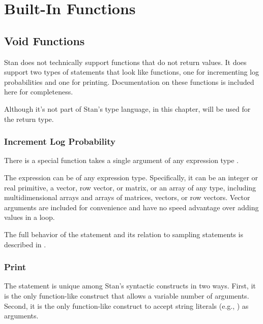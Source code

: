 \part{Built-In Functions}\label{built-in-functions.part}




\chapter{Void Functions}

Stan does not technically support functions that do not return values.
It does support two types of statements that look like functions, one
for incrementing log probabilities and one for printing.
Documentation on these functions is included here for completeness.

Although it's not part of Stan's type language, in this chapter,
 will be used for the return type.

\section{Increment Log Probability}

There is a special function  takes a single
argument of any expression type .
%
\begin{description}
\end{description}
%
The expression  can be of any expression type.  Specifically,
it can be an integer or real primitive, a vector, row vector, or
matrix, or an array of any type, including multidimensional arrays and
arrays of matrices, vectors, or row vectors.  Vector arguments are
included for convenience and have no speed advantage over adding
values in a loop.

The full behavior of the  statement and its
relation to sampling statements is described in
.


\section{Print}

The  statement is unique among Stan's syntactic constructs
in two ways.  First, it is the only function-like construct that
allows a variable number of arguments.  Second, it is the only
function-like construct to accept string literals (e.g., ) as arguments.

